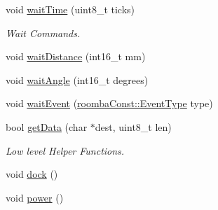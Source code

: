\begin{DoxyCompactItemize}
\item 
void \hyperlink{class_arduino_roomba_a6ddfe1cb8fee12458d00e80b9ef68a19}{waitTime} (uint8\_\-t ticks)
\begin{DoxyCompactList}\small\item\em Wait Commands. \item\end{DoxyCompactList}\item 
void \hyperlink{class_arduino_roomba_a80daa425563387fab74ede7351981861}{waitDistance} (int16\_\-t mm)
\item 
void \hyperlink{class_arduino_roomba_a5eecc857d2d010f7c3ebaa75044f6349}{waitAngle} (int16\_\-t degrees)
\item 
void \hyperlink{class_arduino_roomba_a2a4f3f9a99d4102efef762745631f156}{waitEvent} (\hyperlink{namespaceroomba_const_a045086cbabea77c6a97dbef2c28ac47c}{roombaConst::EventType} type)
\item 
bool \hyperlink{class_arduino_roomba_aaecaeb0ba2c4603d3dd42bd72f8658d1}{getData} (char $\ast$dest, uint8\_\-t len)
\begin{DoxyCompactList}\small\item\em Low level Helper Functions. \item\end{DoxyCompactList}\item 
void \hyperlink{class_arduino_roomba_a36910b1173f76e1d09e3e2769ae07e5e}{dock} ()
\item 
void \hyperlink{class_arduino_roomba_af912edc527c77a7785861c061405c971}{power} ()
\end{DoxyCompactItemize}
